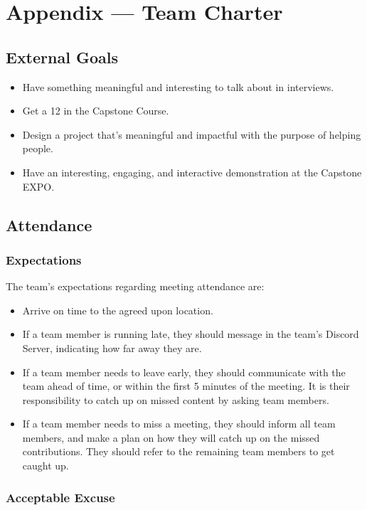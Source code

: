 \documentclass{article}
\begin{document}
\newpage{}

\section*{Appendix --- Team Charter}

\subsection*{External Goals}

\begin{itemize}
\item Have something meaningful and interesting to talk about in interviews.
\item Get a 12 in the Capstone Course.
\item Design a project that's meaningful and impactful with the purpose of helping people.
\item Have an interesting, engaging, and interactive demonstration at the Capstone EXPO.
\end{itemize}

\subsection*{Attendance}

\subsubsection*{Expectations}

\indent The team's expectations regarding meeting attendance are:
\begin{itemize}
  \item Arrive on time to the agreed upon location.
  \item If a team member is running late, they should message in the team's Discord Server, indicating how far away they are.
  \item If a team member needs to leave early, they should communicate with the team ahead of time, or within the first 5 minutes of the meeting. It is their responsibility to catch up on missed content by asking team members.
  \item If a team member needs to miss a meeting, they should inform all team members, and make a plan on how they will catch up on the missed contributions. They should refer to the remaining team members to get caught up.
\end{itemize}

\subsubsection*{Acceptable Excuse}
\end{document}
